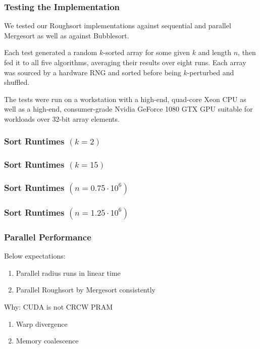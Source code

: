 \documentclass[10pt, xcolor={dvipsnames}, aspectratio=169]{beamer}
\begin{document}
\begin{frame}
\frametitle{Testing the Implementation}
We tested our Roughsort implementations against sequential and parallel Mergesort as well as against Bubblesort. \newline

Each test generated a random $k$-sorted array for some given $k$ and length $n$, then fed it to all five algorithms, averaging
  their results over eight runs. Each array was sourced by a hardware RNG and sorted before being
  $k$-perturbed and shuffled. \newline

The tests were run on a workstation with a high-end, quad-core Xeon CPU as well as a high-end, consumer-grade
  Nvidia GeForce 1080 GTX GPU suitable for workloads over 32-bit array elements.
\end{frame}

\begin{frame}
\frametitle{Sort Runtimes $(k = 2)$}
\begin{figure}
\scalebox{0.4}{}
\end{figure}
\end{frame}

\begin{frame}
\frametitle{Sort Runtimes $(k = 15)$}
\begin{figure}
\scalebox{0.4}{}
\end{figure}
\end{frame}

\begin{frame}
\frametitle{Sort Runtimes $(n = 0.75 \cdot 10^6)$}
\begin{figure}
\scalebox{0.4}{}
\end{figure}
\end{frame}

\begin{frame}
\frametitle{Sort Runtimes $(n = 1.25 \cdot 10^6)$}
\begin{figure}
\scalebox{0.4}{}
\end{figure}
\end{frame}

\begin{frame}
\frametitle{Parallel Performance}
Below expectations:
\begin{enumerate}
	\item Parallel radius runs in linear time
	\item Parallel Roughsort by Mergesort consistently
\end{enumerate}
Why: CUDA is not CRCW PRAM
\begin{enumerate}
	\item Warp divergence
	\item Memory coalescence
\end{enumerate}
\end{frame}
\end{document}
